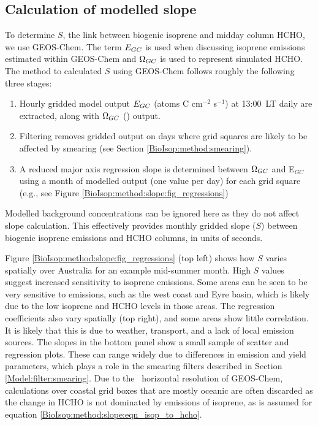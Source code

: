   \subsection{Calculation of modelled slope}
    \label{BioIsop:method:slope_calc}
    
    To determine $S$, the link between biogenic isoprene and midday column HCHO, we use GEOS-Chem.
    The term $E_{GC}$ is used when discussing isoprene emissions estimated within GEOS-Chem and $\Omega_{GC}$ is used to represent simulated HCHO.
    The method to calculated $S$ using GEOS-Chem follows roughly the following three stages: 
    \begin{enumerate}
      \item 
      Hourly gridded model output $E_{GC}$ (atoms C cm$^{-2}$ s$^{-1}$) at 13:00~LT daily are extracted, along with $\Omega_{GC}$  (\moleccm) output.
      \item
      Filtering removes gridded output on days where grid squares are likely to be affected by smearing (see Section \ref{BioIsop:method:smearing}).
      \item 
      A reduced major axis regression slope is determined between $\Omega_{GC}$ and E$_{GC}$ using a month of modelled output (one value per day) for each grid square (e.g., see Figure \ref{BioIsop:method:slope:fig_regressions})
    \end{enumerate}
    Modelled background concentrations can be ignored here as they do not affect slope calculation.
    This effectively provides monthly gridded slope ($S$) between biogenic isoprene emissions and HCHO columns, in units of seconds.
    
    
    Figure \ref{BioIsop:method:slope:fig_regressions} (top left) shows how $S$ varies spatially over Australia for an example mid-summer month.
    High $S$ values suggest increased sensitivity to isoprene emissions.
    Some areas can be seen to be very sensitive to emissions, such as the west coast and Eyre basin, which is likely due to the low isoprene and HCHO levels in those areas.
    The regression coefficients also vary spatially (top right), and some areas show little correlation.
    It is likely that this is due to weather, transport, and a lack of local emission sources.
    The slopes in the bottom panel show a small sample of scatter and regression plots. 
    These can range widely due to differences in emission and yield parameters, which plays a role in the smearing filters described in Section \ref{Model:filter:smearing}.
    Due to the \lowhr ~horizontal resolution of GEOS-Chem, calculations over coastal grid boxes that are mostly oceanic are often discarded as the change in HCHO is not dominated by emissions of isoprene, as is assumed for equation \ref{BioIsop:method:slope:eqn_isop_to_hcho}.
    
